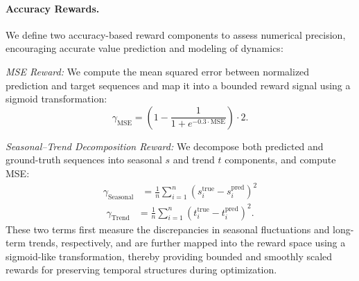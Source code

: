 

\paragraph{Accuracy Rewards.}
We define two accuracy-based reward components to assess numerical precision, encouraging accurate value prediction and modeling of dynamics:

\textit{MSE Reward:} We compute the mean squared error between normalized prediction and target sequences and map it into a bounded reward signal using a sigmoid transformation:
{\setlength{\abovedisplayskip}{5pt}
\setlength{\belowdisplayskip}{5pt}
\begin{equation}
\gamma_{\text{MSE}} = \left(1 - \frac{1}{1 + e^{-0.3 \cdot \text{MSE}}}\right) \cdot 2.
\end{equation}
}


\textit{Seasonal--Trend Decomposition Reward:} We decompose both predicted and ground-truth sequences into seasonal $s$ and trend $t$ components, and compute  MSE:
{\setlength{\abovedisplayskip}{5pt}
\setlength{\belowdisplayskip}{5pt}
\begin{align}
\gamma_{\text{Seasonal}} &= \frac{1}{n} \sum_{i=1}^{n} \left(s_i^{\text{true}} - s_i^{\text{pred}}\right)^2
\end{align}
}
{\setlength{\abovedisplayskip}{5pt}
\setlength{\belowdisplayskip}{5pt}
\begin{align}
\gamma_{\text{Trend}}    &= \frac{1}{n} \sum_{i=1}^{n} \left(t_i^{\text{true}} - t_i^{\text{pred}}\right)^2.
\end{align}
}
These two terms first measure the discrepancies in seasonal fluctuations and long-term trends, respectively, and are further mapped into the reward space using a sigmoid-like transformation, thereby providing bounded and smoothly scaled rewards for preserving temporal structures during optimization.




